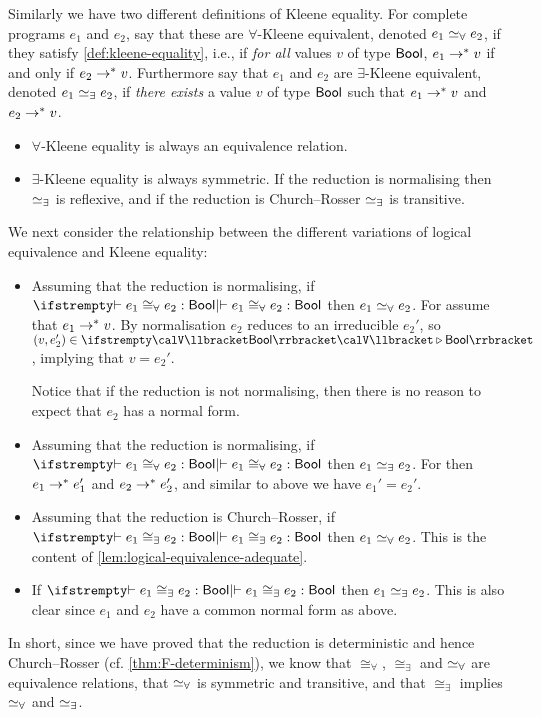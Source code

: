 Similarly we have two different definitions of Kleene equality. For complete programs $e_1$ and $e_2$, say that these are $\forall$-Kleene equivalent, denoted $e_1 \simeq_\forall e_2$, if they satisfy \cref{def:kleene-equality}, i.e., if \emph{for all} values $v$ of type $\mathsf{Bool}$, $e_1 \to^* v$ if and only if $e_2 \to^* v$. Furthermore say that $e_1$ and $e_2$ are $\exists$-Kleene equivalent, denoted $e_1 \simeq_\exists e_2$, if \emph{there exists} a value $v$ of type $\mathsf{Bool}$ such that $e_1 \to^* v$ and $e_2 \to^* v$.

\begin{itemize}
    \item $\forall$-Kleene equality is always an equivalence relation.

    \item $\exists$-Kleene equality is always symmetric. If the reduction is normalising then $\simeq_\exists$ is reflexive, and if the reduction is Church--Rosser $\simeq_\exists$ is transitive.
\end{itemize}

We next consider the relationship between the different variations of logical equivalence and Kleene equality:
%
\begin{itemize}
    \item Assuming that the reduction is normalising, if $\typeindrel{}{}{e_1}{\cong_\forall}{e_2}{\typeBool}$ then $e_1 \simeq_\forall e_2$. For assume that $e_1 \to^* v$. By normalisation $e_2$ reduces to an irreducible $e_2'$, so $(v,e_2') \in \valInt{}{\typeBool}{}$, implying that $v = e_2'$.

    Notice that if the reduction is not normalising, then there is no reason to expect that $e_2$ has a normal form.

    \item Assuming that the reduction is normalising, if $\typeindrel{}{}{e_1}{\cong_\forall}{e_2}{\typeBool}$ then $e_1 \simeq_\exists e_2$. For then $e_1 \to^* e_1'$ and $e_2 \to^* e_2'$, and similar to above we have $e_1' = e_2'$.

    \item Assuming that the reduction is Church--Rosser, if $\typeindrel{}{}{e_1}{\cong_\exists}{e_2}{\typeBool}$ then $e_1 \simeq_\forall e_2$. This is the content of \cref{lem:logical-equivalence-adequate}.

    \item If $\typeindrel{}{}{e_1}{\cong_\exists}{e_2}{\typeBool}$ then $e_1 \simeq_\exists e_2$. This is also clear since $e_1$ and $e_2$ have a common normal form as above.
\end{itemize}

In short, since we have proved that the reduction is deterministic and hence Church--Rosser (cf. \cref{thm:F-determinism}), we know that $\cong_\forall$, $\cong_\exists$ and $\simeq_\forall$ are equivalence relations, that $\simeq_\forall$ is symmetric and transitive, and that $\cong_\exists$ implies $\simeq_\forall$ and $\simeq_\exists$.
